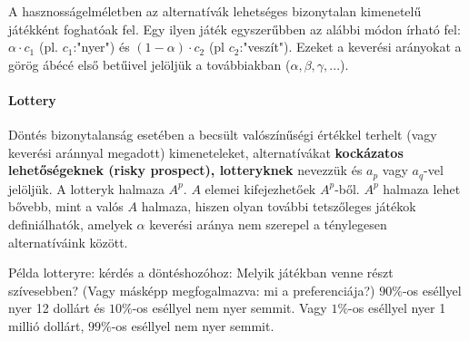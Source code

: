 \documentclass[a4paper,12pt]{article}
\begin{document}


A hasznosságelméletben az alternatívák lehetséges bizonytalan kimenetelű játékként foghatóak fel. Egy ilyen játék egyszerűbben az alábbi módon írható fel: $\alpha \cdot c_1$ (pl. $c_1$:"nyer") és $(1-\alpha) \cdot c_2$ (pl $c_2$:"veszít"). Ezeket a keverési arányokat a görög ábécé első betűivel jelöljük a továbbiakban ($\alpha, \beta, \gamma, ...$).

\paragraph{Lottery} Döntés bizonytalanság esetében a becsült valószínűségi értékkel terhelt (vagy keverési aránnyal megadott) kimeneteleket, alternatívákat \textbf{kockázatos lehetőségeknek (risky prospect), lotteryknek} nevezzük és $a_p$ vagy $a_q$-vel jelöljük. A lotteryk halmaza $A^p$.  $A$ elemei kifejezhetőek $A^p$-ből. $A^p$ halmaza lehet bővebb, mint a valós $A$ halmaza, hiszen olyan további tetszőleges játékok definiálhatók, amelyek $\alpha$ keverési aránya nem szerepel a ténylegesen alternatíváink között.

Példa lotteryre: kérdés a döntéshozóhoz: Melyik játékban venne részt szívesebben? (Vagy másképp megfogalmazva: mi a preferenciája?) $90\%$-os eséllyel nyer 12 dollárt és $10\%$-os eséllyel nem nyer semmit. Vagy $1\%$-os eséllyel nyer 1 millió dollárt, $99\%$-os eséllyel nem nyer semmit.
\end{document}

